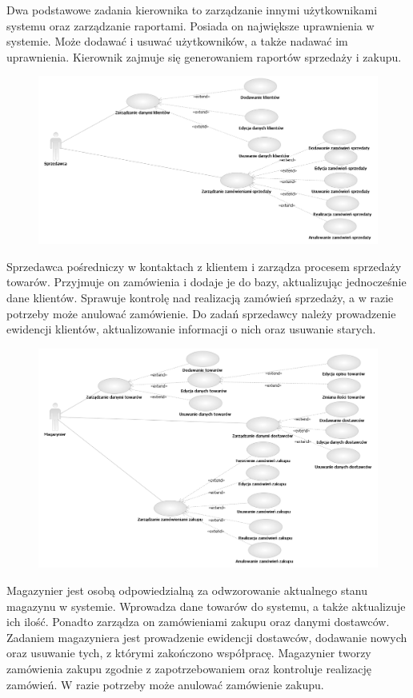 Dwa podstawowe zadania kierownika to zarządzanie innymi użytkownikami 
systemu oraz zarządzanie raportami. Posiada on największe 
uprawnienia w systemie. Może dodawać i usuwać użytkowników, a 
także nadawać im uprawnienia. Kierownik zajmuje się 
generowaniem raportów sprzedaży i zakupu.
\begin{figure}[h]
    \begin{center}
    \includegraphics[angle=-90,scale=0.75]{../img/sprzedawcaUseCase.png}
    \end{center}
    \label{fig:sprzedawcaUseCase}
\end{figure}
\FloatBarrier
Sprzedawca pośredniczy w kontaktach z klientem i zarządza procesem 
sprzedaży towarów. Przyjmuje on zamówienia i dodaje je do bazy, 
aktualizując jednocześnie dane klientów. Sprawuje kontrolę nad 
realizacją zamówień sprzedaży, a w razie potrzeby może anulować zamówienie. 
Do zadań sprzedawcy należy prowadzenie ewidencji klientów, aktualizowanie 
informacji o nich oraz usuwanie starych.
\begin{figure}[h]
    \begin{center}
    \includegraphics[angle=-90,scale=0.75]{../img/magazynierUseCase.png}
    \end{center}
    \label{fig:magazynierUseCase}
\end{figure}
\FloatBarrier
Magazynier jest osobą odpowiedzialną za odwzorowanie aktualnego stanu magazynu 
w systemie. Wprowadza dane towarów do systemu, a także aktualizuje ich 
ilość. Ponadto zarządza on zamówieniami zakupu oraz danymi dostawców. 
Zadaniem magazyniera jest prowadzenie ewidencji dostawców, dodawanie nowych 
oraz usuwanie tych, z którymi zakończono współpracę. Magazynier tworzy zamówienia 
zakupu zgodnie z zapotrzebowaniem oraz kontroluje realizację zamówień. W razie 
potrzeby może anulować zamówienie zakupu.